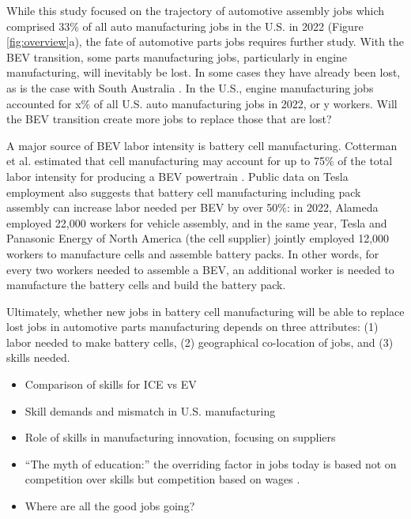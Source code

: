 \documentclass[sn-mathphys,Numbered]{sn-jnl}%
\begin{document}
While this study focused on the trajectory of automotive assembly jobs which comprised 33\% of all auto manufacturing jobs in the U.S. in 2022 (Figure \ref{fig:overview}a), the fate of automotive parts jobs requires further study. With the BEV transition, some parts manufacturing jobs, particularly in engine manufacturing, will inevitably be lost. In some cases they have already been lost, as is the case with South Australia \cite{De_Ruyter2022-xn}. In the U.S., engine manufacturing jobs accounted for x\% of all U.S. auto manufacturing jobs in 2022, or y workers. Will the BEV transition create more jobs to replace those that are lost? 

A major source of BEV labor intensity is battery cell manufacturing. Cotterman et al. estimated that cell manufacturing may account for up to 75\% of the total labor intensity for producing a BEV powertrain \cite{Cotterman2022-jt}. Public data on Tesla employment also suggests that battery cell manufacturing including pack assembly can increase labor needed per BEV by over 50\%: in 2022, Alameda employed 22,000 workers for vehicle assembly, and in the same year, Tesla and Panasonic Energy of North America (the cell supplier) jointly employed 12,000 workers to manufacture cells and assemble battery packs. In other words, for every two workers needed to assemble a BEV, an additional worker is needed to manufacture the battery cells and build the battery pack.

Ultimately, whether new jobs in battery cell manufacturing will be able to replace lost jobs in automotive parts manufacturing depends on three attributes: (1) labor needed to make battery cells, (2) geographical co-location of jobs, and (3) skills needed. 


\begin{itemize}
\item Comparison of skills for ICE vs EV \cite{Cotterman2022-yb}
\item Skill demands and mismatch in U.S. manufacturing \cite{Weaver2017-dx}
\item Role of skills in manufacturing innovation, focusing on suppliers \cite{Helper2016-gb}
\item ``The myth of education:'' the overriding factor in jobs today is based not on competition over skills but competition based on wages \cite{Tasini2021-jk}.
\item Where are all the good jobs going? \cite{Kalleberg2013-wd}
\end{itemize}
\end{document}

